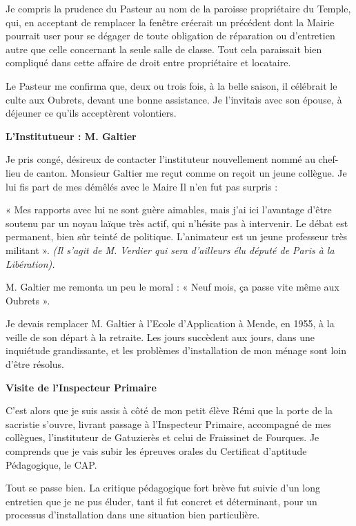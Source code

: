 Je compris la prudence du Pasteur au nom de la paroisse propriétaire du Temple, qui, en
acceptant de remplacer la fenêtre créerait un précédent dont la Mairie pourrait user pour se
dégager de toute obligation de réparation ou d’entretien autre que celle concernant la seule
salle de classe. Tout cela paraissait bien compliqué dans cette affaire de droit entre propriétaire
et locataire.

Le Pasteur me confirma que, deux ou trois fois, à la belle saison, il célébrait le culte aux
Oubrets, devant une bonne assistance. Je l’invitais avec son épouse, à déjeuner ce qu’ils
acceptèrent volontiers.

\textbf{L’Institutueur : M. Galtier}

Je pris congé, désireux de contacter l’instituteur nouvellement nommé au chef-lieu de canton.
Monsieur Galtier me reçut comme on reçoit un jeune collègue. Je lui fis part de mes démêlés
avec le Maire Il n’en fut pas surpris :

« Mes rapports avec lui ne sont guère aimables, mais j’ai ici l’avantage d’être soutenu par un
noyau laïque très actif, qui n’hésite pas à intervenir. Le débat est permanent, bien sûr teinté de
politique. L’animateur est un jeune professeur très militant ». \textit{(Il s’agit de M. Verdier qui sera
d’ailleurs élu député de Paris à la Libération).}

M. Galtier me remonta un peu le moral :
« Neuf mois, ça passe vite même aux Oubrets ».


Je devais remplacer M. Galtier à l’Ecole d’Application à Mende, en 1955, à la veille de son
départ à la retraite. Les jours succèdent aux jours, dans une inquiétude grandissante, et les
problèmes d’installation de mon ménage sont loin d’être résolus.

\textbf{Visite de l’Inspecteur Primaire}

C’est alors que je suis assis à côté de mon petit élève Rémi que la porte de la sacristie s’ouvre,
livrant passage à l’Inspecteur Primaire, accompagné de mes collègues, l’instituteur de
Gatuzierès et celui de Fraissinet de Fourques. Je comprends que je vais subir les épreuves
orales du Certificat d’aptitude Pédagogique, le CAP.

Tout se passe bien. La critique pédagogique fort brève fut suivie d’un long entretien que je ne
pus éluder, tant il fut concret et déterminant, pour un processus d’installation dans une
situation bien particulière.

